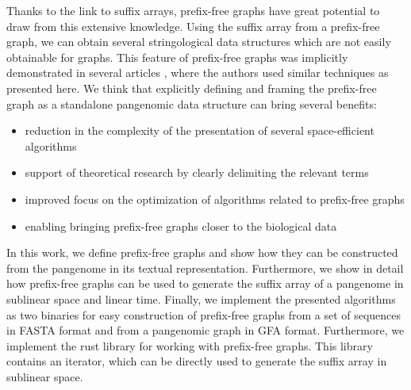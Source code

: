 Thanks to the link to suffix arrays, prefix-free graphs have great potential to draw from this extensive knowledge.
Using the suffix array from a prefix-free graph, we can obtain several stringological data structures which are not easily obtainable for graphs.
This feature of prefix-free graphs was implicitly demonstrated in several articles \cite{2019boucher,rossi2022moni,2022pfwg,2022maria}, where the authors used similar techniques as presented here.
We think that explicitly defining and framing the prefix-free graph as a standalone pangenomic data structure can bring several benefits:

\begin{itemize}
    \item reduction in the complexity of the presentation of several space-efficient algorithms
    \item support of theoretical research by clearly delimiting the relevant terms
    \item improved focus on the optimization of algorithms related to prefix-free graphs
    \item enabling bringing prefix-free graphs closer to the biological data
\end{itemize}

In this work, we define prefix-free graphs and show how they can be constructed from the pangenome in its textual representation.
Furthermore, we show in detail how prefix-free graphs can be used to generate the suffix array of a pangenome in sublinear space and linear time.
Finally, we implement the presented algorithms as two binaries for easy construction of prefix-free graphs from a set of sequences in FASTA format and from a pangenomic graph in GFA format.
Furthermore, we implement the rust library for working with prefix-free graphs.
This library contains an iterator, which can be directly used to generate the suffix array in sublinear space.

